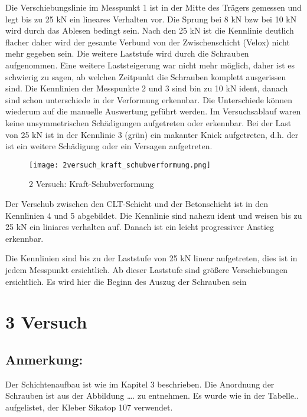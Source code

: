 \documentclass[12 pt,a4 paper ]{scrreprt}
\begin{document}
Die Verschiebungslinie im Messpunkt 1 ist in der Mitte des Trägers gemessen und legt bis zu 25 kN ein lineares Verhalten vor. Die Sprung bei 8 kN bzw bei 10 kN wird durch das Ablesen bedingt sein. Nach den 25 kN ist die Kennlinie deutlich flacher daher wird der gesamte Verbund von der Zwischenschicht (Velox) nicht mehr gegeben sein. Die weitere Laststufe wird durch die Schrauben aufgenommen. Eine weitere Laststeigerung war nicht mehr möglich, daher ist es schwierig zu sagen, ab welchen Zeitpunkt die Schrauben komplett ausgerissen sind.
Die Kennlinien der Messpunkte 2 und 3 sind bin zu 10 kN ident, danach sind schon unterschiede in der Verformung erkennbar. Die Unterschiede können wiederum auf die manuelle Auswertung geführt werden. Im Versuchsablauf waren  keine unsymmetrischen Schädigungen aufgetreten oder erkennbar. Bei der Last von 25 kN ist in der Kennlinie 3 (grün)  ein makanter Knick aufgetreten, d.h. der ist ein weitere Schädigung oder ein Versagen aufgetreten. 



\begin{figure}[h]
\begin{center}
\texttt{[image: 2versuch\_kraft\_schubverformung.png]}
\caption{2 Versuch: Kraft-Schubverformung}
\label{2_versuch_kraft_schubverschiebung}
\end{center}
\end{figure}

Der Verschub zwischen den CLT-Schicht und der Betonschicht ist in den Kennlinien 4 und 5 abgebildet. Die Kennlinie sind nahezu ident und weisen bis zu 25 kN ein liniares verhalten auf. Danach ist ein leicht progressiver Anstieg erkennbar.

Die Kennlinien sind bis zu der Laststufe von 25 kN linear aufgetreten, dies ist in jedem Messpunkt ersichtlich. Ab dieser Laststufe sind größere Verschiebungen ersichtlich. Es wird hier die Beginn des Auszug der Schrauben sein


\section{3 Versuch}

\subsection{Anmerkung:}
Der Schichtenaufbau ist wie im Kapitel 3 beschrieben. Die Anordnung der Schrauben ist aus der Abbildung …. zu entnehmen. Es wurde wie in der Tabelle..  aufgelistet, der Kleber Sikatop 107 verwendet. 
\end{document}
